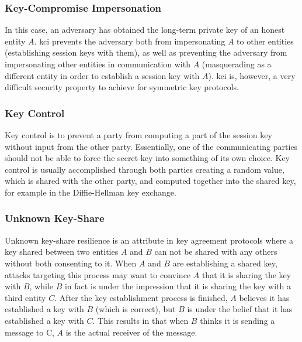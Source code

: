 \subsubsection{Key-Compromise Impersonation}

In this case, an adversary has obtained the long-term private key of an honest entity $A$. \gls{kci} prevents the adversary both from impersonating $A$ to other entities (establishing session keys with them), as well as preventing the adversary from impersonating other entities in communication with $A$ (masquerading as a different entity in order to establish a session key with $A$). \gls{kci} is, however, a very difficult security property to achieve for symmetric key protocols.




\subsubsection{Key Control}

Key control is to prevent a party from computing a part of the session key without input from the other party. Essentially, one of the communicating parties should not be able to force the secret key into something of its own choice. Key control is usually accomplished through both parties creating a random value, which is shared with the other party, and computed together into the shared key, for example in the Diffie-Hellman key exchange.

\subsubsection{Unknown Key-Share}

Unknown key-share resilience is an attribute in key agreement protocols where a key shared between two entities $A$ and $B$ can not be shared with any others without both consenting to it. When $A$ and $B$ are establishing a shared key, attacks targeting this process may want to convince $A$ that it is sharing the key with $B$, while $B$ in fact is under the impression that it is sharing the key with a third entity $C$. After the key establishment process is finished, $A$ believes it has established a key with $B$ (which is correct), but $B$ is under the belief that it has established a key with $C$. This results in that when $B$ thinks it is sending a message to C, $A$ is the actual receiver of the message.



